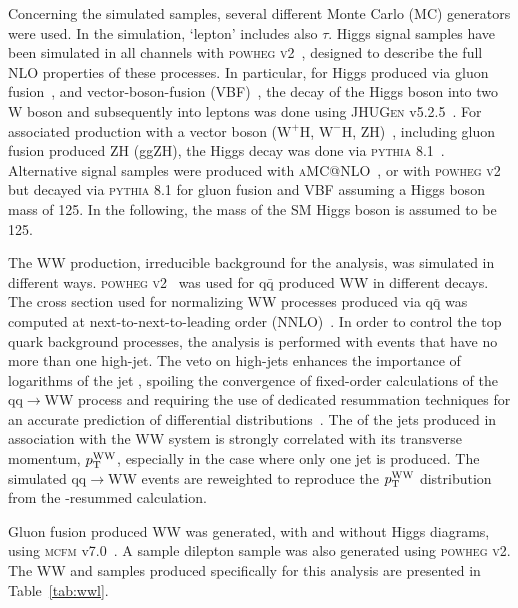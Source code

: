 Concerning the simulated samples, several different Monte Carlo (MC) generators were used. 
In the simulation, `lepton' includes also $\tau$.
Higgs signal samples have been simulated in all channels with
\textsc{powheg v2}~\cite{Nason:2004rx,Frixione:2007vw,Alioli:2010xd}, designed to describe the full NLO properties of these processes.
In particular, for Higgs produced via gluon fusion~\cite{Alioli:2008tz}, and vector-boson-fusion (VBF)~\cite{Nason:2009ai},
the decay of the Higgs boson into two W boson and subsequently into leptons was done using \textsc{JHUGen} v5.2.5~\cite{JHUGen}. 
For associated production with a vector boson ($\mathrm{W}^{+}\mathrm{H}$, $\mathrm{W}^{-}\mathrm{H}$, ZH)~\cite{Luisoni:2013kna}, including gluon fusion produced ZH (ggZH), 
the Higgs decay was done via \textsc{pythia} 8.1~\cite{Sjostrand:2007gs}.  Alternative signal samples were produced with \textsc{aMC@NLO}~\cite{Alwall:2014hca}, or  with \textsc{powheg v2} but decayed via \textsc{pythia} 8.1 for gluon fusion and VBF assuming 
a Higgs boson mass of 125\GeV. In the following, the mass of the SM Higgs boson is assumed to be 125\GeV.

The WW production, irreducible background for the analysis, was simulated in different ways. 
\textsc{powheg v2}~\cite{Melia:2011tj} was used for $\mathrm{q\bar q}$ produced WW in different decays. 
The cross section used for normalizing WW processes produced via $\mathrm{q\bar q}$ was computed at next-to-next-to-leading order (NNLO)~\cite{Gehrmann:2014fva}. 
In order to control the top quark background processes, the analysis is performed with events that have no more than one 
high-\pt jet. The veto on high-\pt jets enhances the importance of logarithms of the jet \pt, spoiling the convergence of 
fixed-order calculations of the qq$\rightarrow$WW process and requiring the use of dedicated resummation techniques for an
accurate prediction of differential distributions~\cite{Meade:2014fca,Jaiswal:2014yba}. 
The \pt of the jets produced in association with the WW system is strongly correlated with its transverse momentum, 
$p_\mathrm{T}^\mathrm{WW}$, especially in the case where only one jet is produced. The simulated qq$\rightarrow$WW events are reweighted  
to reproduce the $p_\mathrm{T}^\mathrm{WW}$ distribution from the \pt-resummed calculation.

Gluon fusion produced WW was generated, with and without Higgs diagrams, using \textsc{mcfm} v7.0~\cite{Campbell:2013wga}. 
A \ttbar sample dilepton sample was also generated using \textsc{powheg v2}. The WW and \ttbar samples 
produced specifically for this analysis are presented in Table~\ref{tab:wwl}.

